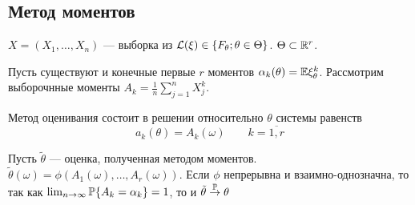 \subsection{Метод моментов}

$X = (X_1, \dotsc, X_n)$ --- выборка из $\mathcal L(\xi)\in\{F_\theta; \theta\in\Theta\}$.
$\Theta\subset\mathbb R^r$.

Пусть существуют и конечные первые $r$ моментов $\alpha_k(\theta) = \mathbb E \xi_\theta^k$.
Рассмотрим выборочнные моменты $A_k = \frac{1}{n}\sum_{j=1}^n X_j^k$.

Метод оценивания состоит
в решении относительно $\theta$ системы равенств
$$a_k(\theta) = A_k(\omega) \qquad k=\overline{1,r}$$

\begin{thm}
Пусть $\tilde\theta$ --- оценка, полученная методом моментов.
${\tilde\theta(\omega) = \phi(A_1(\omega), \dotsc, A_r(\omega))}$.
Если $\phi$ непрерывна и взаимно-однозначна, то
так как ${\lim_{n\to\infty} \mathbb P \{A_k = \alpha_k\} = 1}$,
то и ${\tilde\theta \overset{\mathbb P}{\to} \theta}$
\end{thm}
